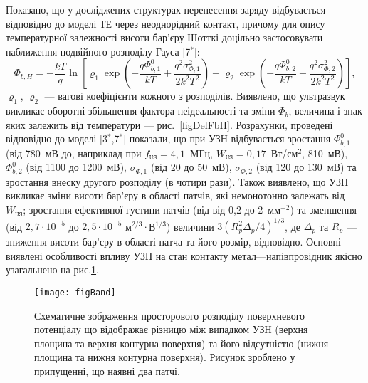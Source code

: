 Показано, що у досліджених структурах перенесення заряду відбувається відповідно до моделі ТЕ через неоднорідний контакт,
причому для опису температурної залежності висоти бар'єру Шотткі доцільно застосовувати наближення подвійного розподілу Гауса
[7$^*$]:
\begin{equation}
\label{eqDG}
  \Phi_{b,H}=-\frac{kT}{q}\ln\left[\varrho_1\exp\left(-\frac{q\Phi_{b,1}^0}{kT}+
  \frac{q^2\sigma^2_{\Phi,1}}{2k^2T^2}\right)
   +
  \varrho_2\exp\left(-\frac{q\Phi_{b,2}^{0}}{kT}+
  \frac{q^2\sigma^2_{\Phi,2}}{2k^2T^2}\right)\right],
\end{equation}
$\varrho_1$, $\varrho_2$  --- вагові коефіцієнти кожного з розподілів.
Виявлено, що ультразвук викликає оборотні збільшення фактора неідеальності та зміни $\Phi_{b}$,
величина і знак яких залежить від температури --- рис.~\ref{figDelFbH}.
Розрахунки, проведені відповідно до моделі
[3$^*$,7$^*$] показали, що при УЗН відбувається зростання
$\Phi_{b,1}^0$ (від 780~мВ до, наприклад при $f_\mathtt{US}=4,1$~МГц, $W_\mathtt{US}=0,17$~Вт/см$^2$,  810~мВ),
$\Phi_{b,2}^0$ (від 1100 до  1200~мВ),
$\sigma_{\Phi,1}$ (від 20 до  50~мВ),
$\sigma_{\Phi,2}$ (від 120 до  130~мВ) та
зростання внеску другого розподілу (в чотири рази).
Також виявлено,
що УЗН викликає зміни висоти бар'єру в області патчів, які немонотонно залежать від $W_\mathtt{US}$;
зростання ефективної густини патчів (від від 0,2 до 2~мм$^{-2}$) та зменшення (від $2,7\cdot10^{-5}$ до $2,5\cdot10^{-5}$ м$^{2/3}\cdot$В$^{1/3}$)
величини $3(R_p^2\Delta_p/4)^{1/3}$, де $\Delta_p$ та $R_p$ --- зниження висоти бар'єру в області патча та його розмір, відповідно.
Основні виявлені особливості впливу УЗН на стан контакту метал---напівпровідник якісно узагальнено на рис.\ref{figBand}.



\begin{figure}
\center
\texttt{[image: figBand]}
\caption{\label{figBand}
Схематичне зображення
просторового розподілу поверхневого потенціалу
що відображає різницю між випадком УЗН (верхня площина та верхня контурна поверхня) та
його відсутністю (нижня площина та нижня контурна поверхня).
Рисунок зроблено у припущенні, що наявні два патчі.
\vspace{1em}
}%
\end{figure}

